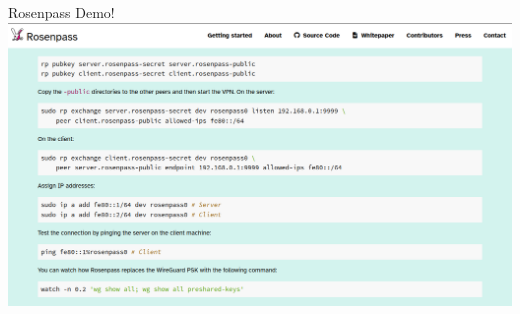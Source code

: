 \documentclass{rosenpass-beamer}
\newcommand*{\namepart}[2][0]{
	\int_set:Nn \l__ptxcd_namepart_int {\clist_count:n {#2}}
	\begin{scope}[xshift=#1]
	\fp_set:Nn \l__ptxcd_namepos_fp {\l__ptxcd_namepart_int / 2}
	\keyval_parse:nnn {\__ptxcd_namepart_item:nn {}}{ \__ptxcd_namepart_item:nn } {#2}
	\end{scope}
}
\newcommand*{\namebraceleft}[2] {
	\draw[decorate]([xshift=-\l__ptxcd_namepart_sep_dim]#2.south~west)--([xshift=-\l__ptxcd_namepart_sep_dim]#1.north~west) ;
}
\newcommand*{\namebraceright}[2]{
	\draw[decorate]([xshift=\l__ptxcd_namepart_sep_dim]#1.north~east) --([xshift=\l__ptxcd_namepart_sep_dim]#2.south~east);
}
\begin{document}

\begin{frame}{Rosenpass Demo!}
  \includegraphics[height=.9\textheight]{assets/2023-03-20-rg-tutorial-screenshot.png}
\end{frame}



\end{document}
